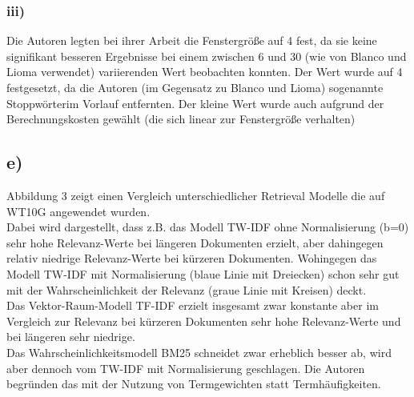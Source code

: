 \subsubsection*{iii)}
Die Autoren legten bei ihrer Arbeit die Fenstergröße auf 4 fest, da sie keine signifikant besseren Ergebnisse bei einem zwischen 6 und 30 (wie von Blanco und Lioma verwendet) variierenden Wert beobachten konnten. Der Wert wurde auf 4 festgesetzt, da die Autoren (im Gegensatz zu Blanco und Lioma) sogenannte \glqq Stoppwörter\grqq im Vorlauf entfernten. Der kleine Wert wurde auch aufgrund der Berechnungskosten gewählt (die sich linear zur Fenstergröße verhalten)
\subsection*{e)}
Abbildung 3 zeigt einen Vergleich unterschiedlicher Retrieval Modelle die auf WT10G angewendet wurden.\\
Dabei wird dargestellt, dass z.B. das Modell TW-IDF ohne Normalisierung (b=0) sehr hohe Relevanz-Werte bei längeren Dokumenten erzielt, aber dahingegen relativ niedrige Relevanz-Werte bei kürzeren Dokumenten. Wohingegen das Modell TW-IDF mit Normalisierung (blaue Linie mit Dreiecken) schon sehr gut mit der Wahrscheinlichkeit der Relevanz (graue Linie mit Kreisen) deckt.\\
Das Vektor-Raum-Modell TF-IDF erzielt insgesamt zwar konstante aber im Vergleich zur Relevanz bei kürzeren Dokumenten sehr hohe Relevanz-Werte und bei längeren sehr niedrige.\\
Das Wahrscheinlichkeitsmodell BM25 schneidet zwar erheblich besser ab, wird aber dennoch vom TW-IDF mit Normalisierung \glqq geschlagen\grqq . Die Autoren begründen das mit der Nutzung von Termgewichten statt Termhäufigkeiten.